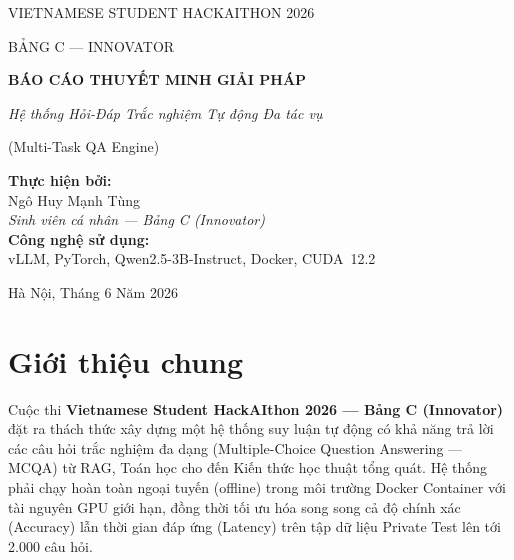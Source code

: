 \documentclass[12pt,a4paper]{article}
\begin{document}
\begin{titlepage}
    \centering
    \vspace*{1cm}

    {\scshape\LARGE VIETNAMESE STUDENT HACKAITHON 2026\par}
    \vspace{0.5cm}
    {\scshape\Large BẢNG C --- INNOVATOR\par}
    \vspace{1.5cm}

    {\huge\bfseries BÁO CÁO THUYẾT MINH GIẢI PHÁP\par}
    \vspace{0.5cm}
    {\large\itshape Hệ thống Hỏi-Đáp Trắc nghiệm Tự động Đa tác vụ\par
    (Multi-Task QA Engine)\par}
    \vspace{2cm}

    \begin{minipage}{0.8\textwidth}
        \centering
        \textbf{Thực hiện bởi:}\\[4pt]
        {\large Ngô Huy Mạnh Tùng}\\[4pt]
        \textit{Sinh viên cá nhân --- Bảng C (Innovator)}\\
        \vspace{0.8cm}
        \textbf{Công nghệ sử dụng:}\\[4pt]
        vLLM, PyTorch, Qwen2.5-3B-Instruct, Docker, CUDA~12.2
    \end{minipage}

    \vfill
    {\large Hà Nội, Tháng 6 Năm 2026\par}
\end{titlepage}

\tableofcontents
\newpage

\section{Giới thiệu chung}

Cuộc thi \textbf{Vietnamese Student HackAIthon 2026 --- Bảng C (Innovator)} đặt ra
thách thức xây dựng một hệ thống suy luận tự động có khả năng trả lời các câu hỏi
trắc nghiệm đa dạng (Multiple-Choice Question Answering --- MCQA) từ RAG,
Toán học cho đến Kiến thức học thuật tổng quát.
Hệ thống phải chạy hoàn toàn ngoại tuyến (offline) trong môi trường Docker
Container với tài nguyên GPU giới hạn, đồng thời tối ưu hóa song song cả
độ chính xác (Accuracy) lẫn thời gian đáp ứng (Latency) trên tập dữ liệu
Private Test lên tới 2.000 câu hỏi.
\end{document}
